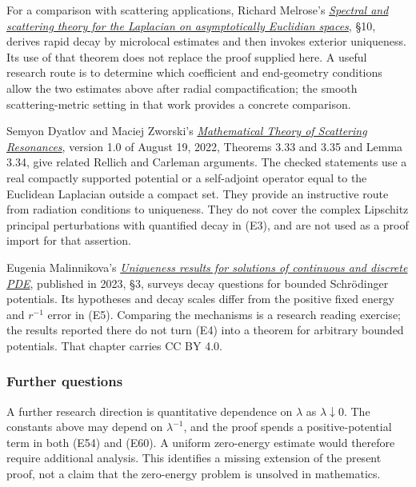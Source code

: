\documentclass[
  11pt,
]{article}
\begin{document}
For a comparison with scattering applications, Richard Melrose's
\href{https://math.mit.edu/~rbm/papers/sslaes/sslaes1.pdf}{\emph{Spectral
and scattering theory for the Laplacian on asymptotically Euclidian
spaces}}, §10, derives rapid decay by microlocal estimates and then
invokes exterior uniqueness. Its use of that theorem does not replace
the proof supplied here. A useful research route is to determine which
coefficient and end-geometry conditions allow the two estimates above
after radial compactification; the smooth scattering-metric setting in
that work provides a concrete comparison.

Semyon Dyatlov and Maciej Zworski's
\href{https://math.mit.edu/~dyatlov/res/res_final.pdf}{\emph{Mathematical
Theory of Scattering Resonances}}, version 1.0 of August 19, 2022,
Theorems 3.33 and 3.35 and Lemma 3.34, give related Rellich and Carleman
arguments. The checked statements use a real compactly supported
potential or a self-adjoint operator equal to the Euclidean Laplacian
outside a compact set. They provide an instructive route from radiation
conditions to uniqueness. They do not cover the complex Lipschitz
principal perturbations with quantified decay in (E3), and are not used
as a proof import for that assertion.

Eugenia Malinnikova's
\href{https://ems.press/books/standalone/262/5198}{\emph{Uniqueness
results for solutions of continuous and discrete PDE}}, published in
2023, §3, surveys decay questions for bounded Schrödinger potentials.
Its hypotheses and decay scales differ from the positive fixed energy
and \(r^{-1}\) error in (E5). Comparing the mechanisms is a research
reading exercise; the results reported there do not turn (E4) into a
theorem for arbitrary bounded potentials. That chapter carries CC BY
4.0.

\subsubsection{Further questions}\label{further-questions}

A further research direction is quantitative dependence on \(\lambda\)
as \(\lambda\downarrow0\). The constants above may depend on
\(\lambda^{-1}\), and the proof spends a positive-potential term in both
(E54) and (E60). A uniform zero-energy estimate would therefore require
additional analysis. This identifies a missing extension of the present
proof, not a claim that the zero-energy problem is unsolved in
mathematics.
\end{document}
